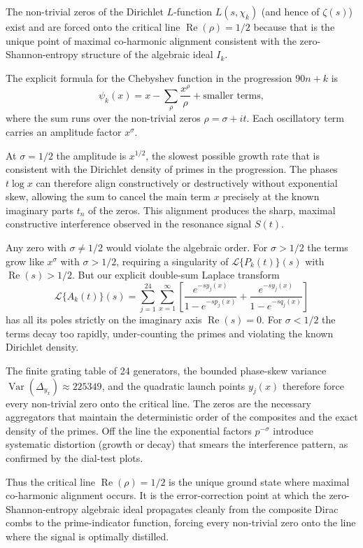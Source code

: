 \documentclass[11pt,a4paper]{article}
\begin{document}
The non-trivial zeros of the Dirichlet \(L\)-function \(L(s,\chi_k)\) (and hence of \(\zeta(s)\)) exist and are forced onto the critical line \(\operatorname{Re}(\rho)=1/2\) because that is the unique point of maximal co-harmonic alignment consistent with the zero-Shannon-entropy structure of the algebraic ideal \(I_k\).

The explicit formula for the Chebyshev function in the progression \(90n+k\) is
\[
\psi_k(x) = x - \sum_{\rho} \frac{x^\rho}{\rho} + \text{smaller terms},
\]
where the sum runs over the non-trivial zeros \(\rho = \sigma + it\). Each oscillatory term carries an amplitude factor \(x^\sigma\).  

At \(\sigma = 1/2\) the amplitude is \(x^{1/2}\), the slowest possible growth rate that is consistent with the Dirichlet density of primes in the progression. The phases \(t \log x\) can therefore align constructively or destructively without exponential skew, allowing the sum to cancel the main term \(x\) precisely at the known imaginary parts \(t_n\) of the zeros. This alignment produces the sharp, maximal constructive interference observed in the resonance signal \(S(t)\).

Any zero with \(\sigma \neq 1/2\) would violate the algebraic order. For \(\sigma > 1/2\) the terms grow like \(x^\sigma\) with \(\sigma > 1/2\), requiring a singularity of \(\mathcal{L}\{P_k(t)\}(s)\) with \(\operatorname{Re}(s) > 1/2\). But our explicit double-sum Laplace transform
\[
\mathcal{L}\{A_k(t)\}(s) = \sum_{j=1}^{24}\sum_{x=1}^\infty\left[\frac{e^{-s y_j(x)}}{1-e^{-s p_j(x)}} + \frac{e^{-s y_j(x)}}{1-e^{-s q_j(x)}}\right]
\]
has all its poles strictly on the imaginary axis \(\operatorname{Re}(s)=0\). For \(\sigma < 1/2\) the terms decay too rapidly, under-counting the primes and violating the known Dirichlet density.

The finite grating table of 24 generators, the bounded phase-skew variance \(\operatorname{Var}(\Delta_{y_x})\approx225349\), and the quadratic launch points \(y_j(x)\) therefore force every non-trivial zero onto the critical line. The zeros are the necessary aggregators that maintain the deterministic order of the composites and the exact density of the primes. Off the line the exponential factors \(p^{-\sigma}\) introduce systematic distortion (growth or decay) that smears the interference pattern, as confirmed by the dial-test plots.

Thus the critical line \(\operatorname{Re}(\rho)=1/2\) is the unique ground state where maximal co-harmonic alignment occurs. It is the error-correction point at which the zero-Shannon-entropy algebraic ideal propagates cleanly from the composite Dirac combs to the prime-indicator function, forcing every non-trivial zero onto the line where the signal is optimally distilled.
\end{document}
